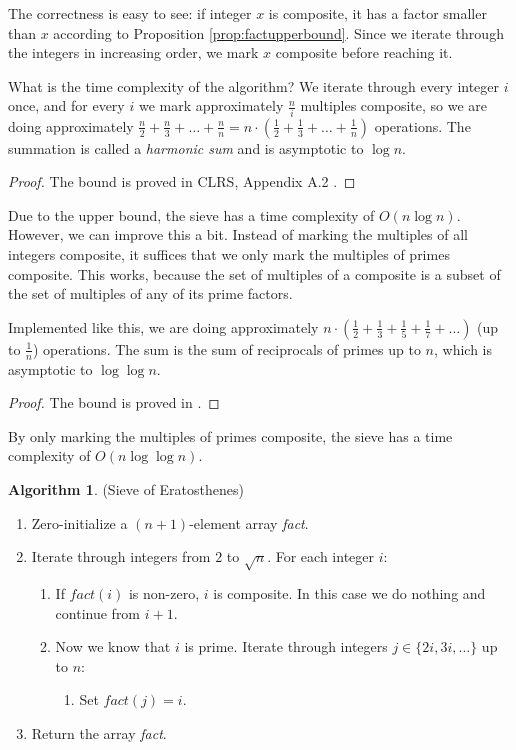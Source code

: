 \documentclass[12pt] {article}
\theoremstyle{plain}
\theoremstyle{definition}
\newtheorem{algo}[thm]{Algorithm}
\begin{document}
The correctness is easy to see: if integer $x$ is composite, it has a factor smaller than $x$ according to Proposition \ref{prop:factupperbound}. Since we iterate through the integers in increasing order, we mark $x$ composite before reaching it.

What is the time complexity of the algorithm? We iterate through every integer $i$ once, and for every $i$ we mark approximately $\frac{n}{i}$ multiples composite, so we are doing approximately $\frac{n}{2} + \frac{n}{3} + \dots + \frac{n}{n} = n \cdot (\frac{1}{2} + \frac{1}{3} + \dots + \frac{1}{n})$ operations. The summation is called a \textit{harmonic sum} and is asymptotic to $\log{n}$.

\begin{proof}
The bound is proved in CLRS, Appendix A.2 \cite{clrs}.
\end{proof}

Due to the upper bound, the sieve has a time complexity of $O(n \log n)$. However, we can improve this a bit. Instead of marking the multiples of all integers composite, it suffices that we only mark the multiples of primes composite. This works, because the set of multiples of a composite is a subset of the set of multiples of any of its prime factors. 

Implemented like this, we are doing approximately $n \cdot (\frac{1}{2} + \frac{1}{3} + \frac{1}{5} + \frac{1}{7} + \dots)$ (up to $\frac{1}{n}$) operations. The sum is the sum of reciprocals of primes up to $n$, which is asymptotic to $\log{\log{n}}$.

\begin{proof}
The bound is proved in \cite{primereciprocal}.
\end{proof}

By only marking the multiples of primes composite, the sieve has a time complexity of $O(n \log{\log{n}})$.

\begin{algo} (Sieve of Eratosthenes)
\begin{enumerate}
\item Zero-initialize a $(n+1)$-element array \textit{fact}.
\item Iterate through integers from $2$ to $\sqrt{n}$. For each integer $i$:
\begin{enumerate}
	\item If $fact(i)$ is non-zero, $i$ is composite. In this case we do nothing and continue from $i+1$.
	\item Now we know that $i$ is prime. Iterate through integers $j \in \{2i, 3i, \dots\}$ up to $n$:
	\begin{enumerate}
		\item Set $fact(j) = i$.
	\end{enumerate}
\end{enumerate}
\item Return the array \textit{fact}.
\end{enumerate}
\end{algo}
\end{document}

